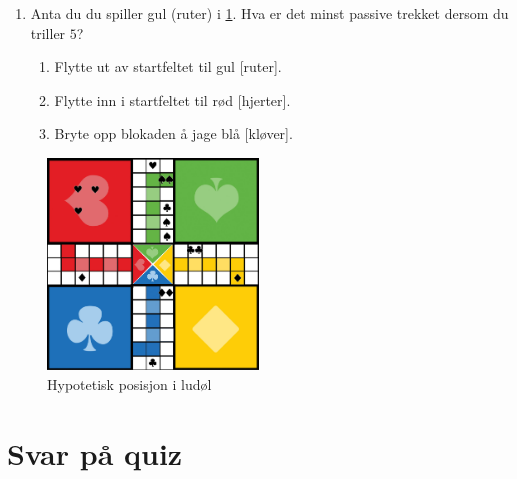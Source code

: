 \documentclass[10pt,a4paper,norsk,openany]{book}
\begin{document}
\begin{enumerate}
      \item Anta du du spiller gul (ruter) i \cref{fig:ludolbrett-1}. Hva er det
    minst passive trekket dersom du triller $5$?
    \begin{enumerate}
      \item Flytte ut av startfeltet til gul [ruter].
      \item Flytte inn i startfeltet til rød [hjerter].
      \item Bryte opp blokaden å jage blå [kløver].
    \end{enumerate}
\end{enumerate}

\begin{figure}[htbp!]
  \centering
  \includegraphics[width=0.5\textwidth]{ludobrett-2}
  \caption{Hypotetisk posisjon i ludøl}
  \label{fig:ludolbrett-1}
\end{figure}

\newpage

\section{Svar på quiz}
\end{document}
